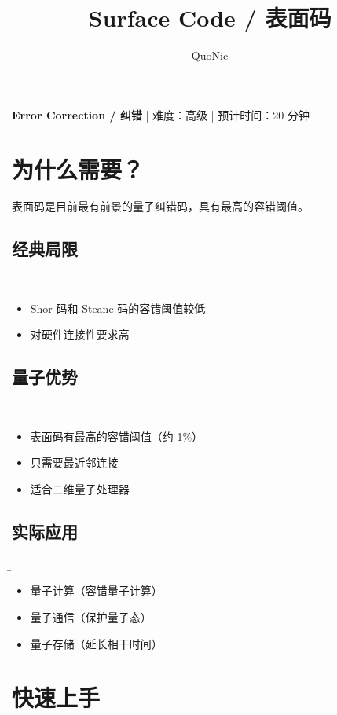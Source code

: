 \documentclass[12pt,a4paper]{article}
\title{Surface Code / 表面码}
\author{QuoNic}
\date{}
\begin{document}
\maketitle

\begin{center}
\textbf{Error Correction / 纠错} | 难度：高级 | 预计时间：20 分钟
\end{center}

\tableofcontents
\newpage

\section{为什么需要？}

表面码是目前最有前景的量子纠错码，具有最高的容错阈值。

\subsection{经典局限}
\b\begin{itemize}
  \item Shor 码和 Steane 码的容错阈值较低
  \item 对硬件连接性要求高
\end{itemize}

\subsection{量子优势}
\b\begin{itemize}
  \item 表面码有最高的容错阈值（约 1\%）
  \item 只需要最近邻连接
  \item 适合二维量子处理器
\end{itemize}

\subsection{实际应用}
\b\begin{itemize}
  \item 量子计算（容错量子计算）
  \item 量子通信（保护量子态）
  \item 量子存储（延长相干时间）
\end{itemize}

\section{快速上手}
\end{document}
